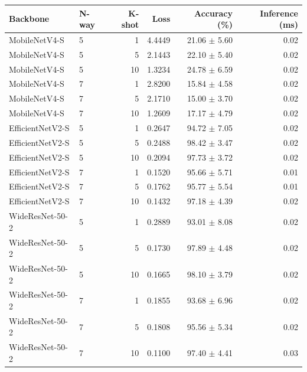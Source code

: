 \begin{tabular}{llrrrr}
Backbone & N-way & K-shot & Loss & Accuracy (\%) & Inference (ms) \\ \hline
MobileNetV4-S & 5 & 1 & 4.4449 & 21.06 $\pm$ 5.60 & 0.02 \\
MobileNetV4-S & 5 & 5 & 2.1443 & 22.10 $\pm$ 5.40 & 0.02 \\
MobileNetV4-S & 5 & 10 & 1.3234 & 24.78 $\pm$ 6.59 & 0.02 \\
MobileNetV4-S & 7 & 1 & 2.8200 & 15.84 $\pm$ 4.58 & 0.02 \\
MobileNetV4-S & 7 & 5 & 2.1710 & 15.00 $\pm$ 3.70 & 0.02 \\
MobileNetV4-S & 7 & 10 & 1.2609 & 17.17 $\pm$ 4.79 & 0.02 \\
EfficientNetV2-S & 5 & 1 & 0.2647 & 94.72 $\pm$ 7.05 & 0.02 \\
EfficientNetV2-S & 5 & 5 & 0.2488 & 98.42 $\pm$ 3.47 & 0.02 \\
EfficientNetV2-S & 5 & 10 & 0.2094 & 97.73 $\pm$ 3.72 & 0.02 \\
EfficientNetV2-S & 7 & 1 & 0.1520 & 95.66 $\pm$ 5.71 & 0.01 \\
EfficientNetV2-S & 7 & 5 & 0.1762 & 95.77 $\pm$ 5.54 & 0.01 \\
EfficientNetV2-S & 7 & 10 & 0.1432 & 97.18 $\pm$ 4.39 & 0.02 \\
WideResNet-50-2 & 5 & 1 & 0.2889 & 93.01 $\pm$ 8.08 & 0.02 \\
WideResNet-50-2 & 5 & 5 & 0.1730 & 97.89 $\pm$ 4.48 & 0.02 \\
WideResNet-50-2 & 5 & 10 & 0.1665 & 98.10 $\pm$ 3.79 & 0.02 \\
WideResNet-50-2 & 7 & 1 & 0.1855 & 93.68 $\pm$ 6.96 & 0.02 \\
WideResNet-50-2 & 7 & 5 & 0.1808 & 95.56 $\pm$ 5.34 & 0.02 \\
WideResNet-50-2 & 7 & 10 & 0.1100 & 97.40 $\pm$ 4.41 & 0.03 \\
\end{tabular}

